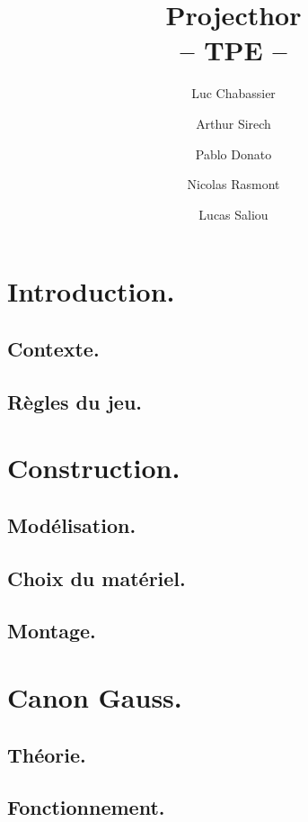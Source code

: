 \documentclass{report}
\title{Projecthor\\-- TPE --}
\author{Luc Chabassier \and Arthur Sirech \and Pablo Donato \and Nicolas Rasmont \and Lucas Saliou}
\begin{document}
\maketitle

\tableofcontents

\part{Introduction.}
\chapter{Contexte.} \label{intro}
% 

\chapter{Règles du jeu.} \label{regles}
% 

\part{Construction.}
\chapter{Modélisation.} \label{moter}
% 

\chapter{Choix du matériel.} \label{mater} %
% 
% 

\chapter{Montage.} \label{mont}
% 

\part{Canon Gauss.}
\chapter{Théorie.} \label{gauss}
% 

\chapter{Fonctionnement.} \label{fonc}
% 
\end{document}

